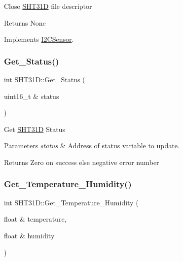 Close \hyperlink{classSHT31D}{S\+H\+T31D} file descriptor

\begin{DoxyReturn}{Returns}
None 
\end{DoxyReturn}


Implements \hyperlink{classI2CSensor_acee1633439e97bae412441ac085fabba}{I2\+C\+Sensor}.

\mbox{\label{classSHT31D_ada8e1773dee18a8a76656bb2d41b19f1}} 
\subsubsection{\texorpdfstring{Get\+\_\+\+Status()}{Get\_Status()}}
{\footnotesize\ttfamily int S\+H\+T31\+D\+::\+Get\+\_\+\+Status (\begin{DoxyParamCaption}\item[{uint16\+\_\+t \&}]{status }\end{DoxyParamCaption})}

Get \hyperlink{classSHT31D}{S\+H\+T31D} Status


\begin{DoxyParams}{Parameters}
{\em status} & Address of status variable to update.\\
\hline
\end{DoxyParams}
\begin{DoxyReturn}{Returns}
Zero on success else negative error number 
\end{DoxyReturn}
\mbox{\label{classSHT31D_a749e5909bbd129e6352a32f28aef96d8}} 
\subsubsection{\texorpdfstring{Get\+\_\+\+Temperature\+\_\+\+Humidity()}{Get\_Temperature\_Humidity()}}
{\footnotesize\ttfamily int S\+H\+T31\+D\+::\+Get\+\_\+\+Temperature\+\_\+\+Humidity (\begin{DoxyParamCaption}\item[{float \&}]{temperature,  }\item[{float \&}]{humidity }\end{DoxyParamCaption})}

